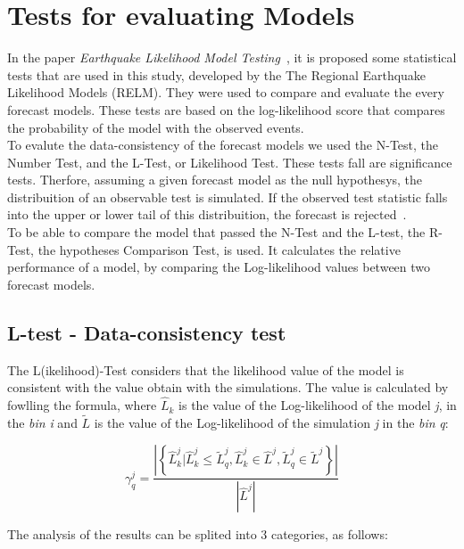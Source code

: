 \section{Tests for evaluating Models}\label{Tests}
In the paper {\it Earthquake Likelihood Model Testing}~\cite{schorlemmer2007earthquake}, it is proposed some statistical tests that are used in this study, developed by the The
Regional Earthquake Likelihood Models (RELM). They were used to compare
and evaluate the every forecast models. These tests are based on the
log-likelihood score that compares the probability of the model with
the observed events.\\

To evalute the data-consistency of the forecast models we used the
N-Test, the Number Test, and the L-Test, or Likelihood Test. These
tests fall are significance tests. Therfore, assuming a given forecast
model as the null hypothesys, the distribuition of an observable test
is simulated. If the observed test statistic falls into the upper or
lower tail of this distribuition, the forecast is
rejected~\cite{schorlemmer2010first}.\\

To be able to compare the model that passed the N-Test and the L-test,
the R-Test, the hypotheses Comparison Test, is used. It calculates the
relative performance of a model, by comparing the Log-likelihood
values between two forecast models.\\
\subsection{L-test - Data-consistency test}\label{Ltest}
The L(ikelihood)-Test considers that the likelihood value of the model
is consistent with the value obtain with the simulations. The value is
calculated by fowlling the formula, where $\widehat{L}_k$ is the value of the
Log-likelihood of the model {\it j}, in the {\it bin} {\it i} and
$\widetilde{L}$ is the value of the Log-likelihood of the simulation
{\it j} in the {\it bin} {\it q}:


\begin{equation}
\gamma^{j}_{q} = \frac{\left| \left\{ \widehat{L}^j_k | \widehat{L}^j_k \leq \widetilde{L}^j_q, \widehat{L}^j_k \in \widehat{L}^j, \widetilde{L}^j_q \in \widetilde{L}^j  \right\} \right|}  {|\widehat{L}^j|}
\end{equation}

The analysis of the results can be splited into 3 categories, as follows:

